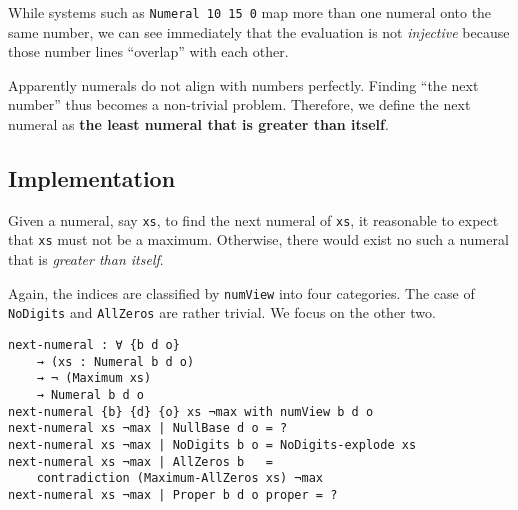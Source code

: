 \documentclass[\main/thesis.tex]{subfiles}
\begin{document}
While systems such as {\lstinline|Numeral 10 15 0|} map more than one numeral
onto the same number, we can see immediately that the evaluation is not
\textit{injective} because those number lines ``overlap'' with each other.

\begin{center}
    \begin{adjustbox}{max width=\textwidth}
    \end{adjustbox}
\end{center}

Apparently numerals do not align with numbers perfectly.
Finding ``the next number'' thus becomes a non-trivial problem.
Therefore, we define the next numeral as
\textbf{the least numeral that is greater than itself}.

\subsection{Implementation}

Given a numeral, say {\lstinline|xs|}, to find the next numeral of {\lstinline|xs|},
it reasonable to expect that {\lstinline|xs|} must not be a maximum.
Otherwise, there would exist no such a numeral that is \textit{greater than itself}.

Again, the indices are classified by {\lstinline|numView|} into four categories.
The case of {\lstinline|NoDigits|} and {\lstinline|AllZeros|} are rather trivial.
We focus on the other two.

\begin{lstlisting}
next-numeral : ∀ {b d o}
    → (xs : Numeral b d o)
    → ¬ (Maximum xs)
    → Numeral b d o
next-numeral {b} {d} {o} xs ¬max with numView b d o
next-numeral xs ¬max | NullBase d o = ?
next-numeral xs ¬max | NoDigits b o = NoDigits-explode xs
next-numeral xs ¬max | AllZeros b   =
    contradiction (Maximum-AllZeros xs) ¬max
next-numeral xs ¬max | Proper b d o proper = ?
\end{lstlisting}
\end{document}
